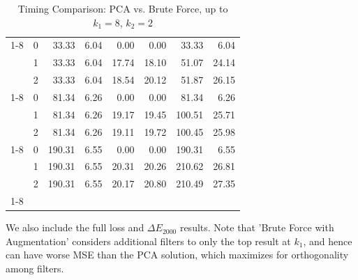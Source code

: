 \begin{table}[htbp]
\begin{tabular}{llrrrrrr}
    \cline{1-8}
    \multirow[t]{3}{*}{6} & 0 & 33.33 & 6.04 & 0.00 & 0.00 & 33.33 & 6.04 \\
    & 1 & 33.33 & 6.04 & 17.74 & 18.10 & 51.07 & 24.14 \\
    & 2 & 33.33 & 6.04 & 18.54 & 20.12 & 51.87 & 26.15 \\
    \cline{1-8}
    \multirow[t]{3}{*}{7} & 0 & 81.34 & 6.26 & 0.00 & 0.00 & 81.34 & 6.26 \\
    & 1 & 81.34 & 6.26 & 19.17 & 19.45 & 100.51 & 25.71 \\
    & 2 & 81.34 & 6.26 & 19.11 & 19.72 & 100.45 & 25.98 \\
    \cline{1-8}
    \multirow[t]{3}{*}{8} & 0 & 190.31 & 6.55 & 0.00 & 0.00 & 190.31 & 6.55 \\
    & 1 & 190.31 & 6.55 & 20.31 & 20.26 & 210.62 & 26.81 \\
    & 2 & 190.31 & 6.55 & 20.17 & 20.80 & 210.49 & 27.35 \\
    \cline{1-8}
    \bottomrule
    \end{tabular}
    \caption{Timing Comparison: PCA vs. Brute Force, up to $k_1=8$, $k_2=2$}
    \label{tab:timing_comparison}

\end{table}
\newpage
We also include the full loss and $\Delta E_{2000}$ results. 
Note that 'Brute Force with Augmentation' considers additional filters to only the top result at $k_1$, and hence can have worse MSE than the PCA solution, which maximizes for orthogonality among filters. 

